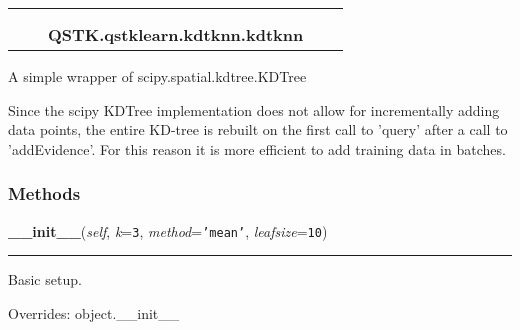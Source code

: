     \label{QSTK:qstklearn:kdtknn:kdtknn}
\begin{tabular}{cccccc}
\multicolumn{2}{r}{\settowidth{\BCL}{object}\multirow{2}{\BCL}{object}}
&&
  \\\cline{3-3}
  &&\multicolumn{1}{c|}{}
&&
  \\
&&\multicolumn{2}{l}{\textbf{QSTK.qstklearn.kdtknn.kdtknn}}
\end{tabular}

A simple wrapper of scipy.spatial.kdtree.KDTree

Since the scipy KDTree implementation does not allow for incrementally 
adding data points, the entire KD-tree is rebuilt on the first call to 
'query' after a call to 'addEvidence'. For this reason it is more efficient
to add training data in batches.



  \subsubsection{Methods}

    \vspace{0.5ex}

\hspace{.8\funcindent}\begin{boxedminipage}{\funcwidth}

    \raggedright \textbf{\_\_init\_\_}(\textit{self}, \textit{k}={\tt 3}, \textit{method}={\tt \texttt{'}\texttt{mean}\texttt{'}}, \textit{leafsize}={\tt 10})

    \vspace{-1.5ex}

    \rule{\textwidth}{0.5\fboxrule}
\setlength{\parskip}{2ex}
    Basic setup.

\setlength{\parskip}{1ex}
      Overrides: object.\_\_init\_\_

    \end{boxedminipage}

    \label{QSTK:qstklearn:kdtknn:kdtknn:addEvidence}

    \vspace{0.5ex}

